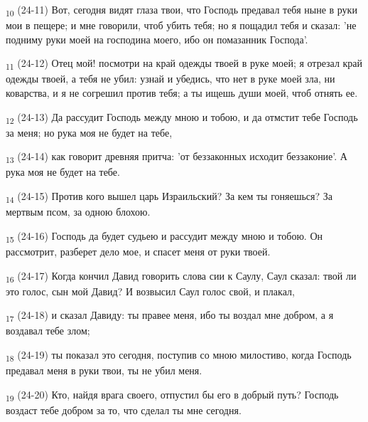 \begin{tcolorbox}
\textsubscript{10} (24-11) Вот, сегодня видят глаза твои, что Господь предавал тебя ныне в руки мои в пещере; и мне говорили, чтоб убить тебя; но я пощадил тебя и сказал: 'не подниму руки моей на господина моего, ибо он помазанник Господа'.
\end{tcolorbox}
\begin{tcolorbox}
\textsubscript{11} (24-12) Отец мой! посмотри на край одежды твоей в руке моей; я отрезал край одежды твоей, а тебя не убил: узнай и убедись, что нет в руке моей зла, ни коварства, и я не согрешил против тебя; а ты ищешь души моей, чтоб отнять ее.
\end{tcolorbox}
\begin{tcolorbox}
\textsubscript{12} (24-13) Да рассудит Господь между мною и тобою, и да отмстит тебе Господь за меня; но рука моя не будет на тебе,
\end{tcolorbox}
\begin{tcolorbox}
\textsubscript{13} (24-14) как говорит древняя притча: 'от беззаконных исходит беззаконие'. А рука моя не будет на тебе.
\end{tcolorbox}
\begin{tcolorbox}
\textsubscript{14} (24-15) Против кого вышел царь Израильский? За кем ты гоняешься? За мертвым псом, за одною блохою.
\end{tcolorbox}
\begin{tcolorbox}
\textsubscript{15} (24-16) Господь да будет судьею и рассудит между мною и тобою. Он рассмотрит, разберет дело мое, и спасет меня от руки твоей.
\end{tcolorbox}
\begin{tcolorbox}
\textsubscript{16} (24-17) Когда кончил Давид говорить слова сии к Саулу, Саул сказал: твой ли это голос, сын мой Давид? И возвысил Саул голос свой, и плакал,
\end{tcolorbox}
\begin{tcolorbox}
\textsubscript{17} (24-18) и сказал Давиду: ты правее меня, ибо ты воздал мне добром, а я воздавал тебе злом;
\end{tcolorbox}
\begin{tcolorbox}
\textsubscript{18} (24-19) ты показал это сегодня, поступив со мною милостиво, когда Господь предавал меня в руки твои, ты не убил меня.
\end{tcolorbox}
\begin{tcolorbox}
\textsubscript{19} (24-20) Кто, найдя врага своего, отпустил бы его в добрый путь? Господь воздаст тебе добром за то, что сделал ты мне сегодня.
\end{tcolorbox}
